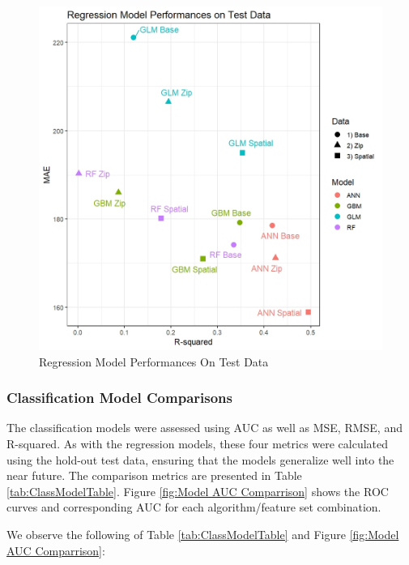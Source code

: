 \documentclass[conference,final,]{IEEEtran}
\makeatletter
\def\maxwidth{\ifdim\Gin@nat@width>\linewidth\linewidth
\else\Gin@nat@width\fi}
\let\Oldincludegraphics\includegraphics
\renewcommand{\includegraphics}[1]{\Oldincludegraphics[width=\maxwidth]{#1}}
\makeatother
\begin{document}
\begin{figure}
\centering
\includegraphics{Sections/tables_and_figures/reg_model_results_scatterplot.jpeg}
\caption{\label{fig:Models Scatterplot}Regression Model Performances On
Test Data}
\end{figure}

\hypertarget{classification-model-comparisons}{%
\subsubsection{Classification Model
Comparisons}\label{classification-model-comparisons}}

The classification models were assessed using AUC as well as MSE, RMSE,
and R-squared. As with the regression models, these four metrics were
calculated using the hold-out test data, ensuring that the models
generalize well into the near future. The comparison metrics are
presented in Table \ref{tab:ClassModelTable}. Figure
\ref{fig:Model AUC Comparrison} shows the ROC curves and corresponding
AUC for each algorithm/feature set combination.

\noindent We observe the following of Table \ref{tab:ClassModelTable}
and Figure \ref{fig:Model AUC Comparrison}:
\end{document}
